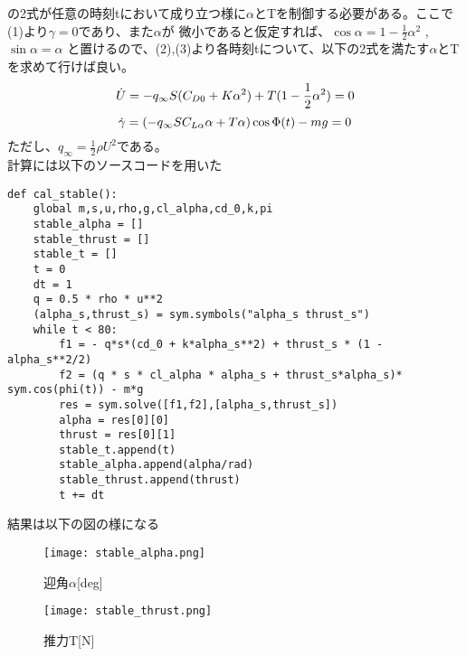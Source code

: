 \documentclass[15pt,uplatex,dvipdfmx]{jsarticle}
\begin{document}
の2式が任意の時刻tにおいて成り立つ様に$\alpha$とTを制御する必要がある。ここで(1)より$\gamma = 0$であり、また$\alpha$が
微小であると仮定すれば、$\cos{\alpha} = 1 - \frac{1}{2} {\alpha}^2$ ,\, $\sin{\alpha} = \alpha$
と置けるので、(2),(3)より各時刻tについて、以下の2式を満たす$\alpha$とTを求めて行けば良い。
\begin{equation}
   \dot{U} = - q_{\infty}S(C_{D0} + K{\alpha}^2) + T(1 - \frac{1}{2} \alpha^2) = 0 \\
\end{equation}
\begin{equation}
  \dot{\gamma} = (- q_{\infty}S C_{L\alpha} \alpha + T\alpha)\cos{\Phi(t)} - mg = 0\\
\end{equation}
ただし、$ q_{\infty}= \frac{1}{2}\rho U^2 $である。 \\
計算には以下のソースコードを用いた \\

\begin{lstlisting}[basicstyle=\ttfamily\footnotesize, frame=single]
def cal_stable():
    global m,s,u,rho,g,cl_alpha,cd_0,k,pi
    stable_alpha = []
    stable_thrust = []
    stable_t = []
    t = 0
    dt = 1
    q = 0.5 * rho * u**2
    (alpha_s,thrust_s) = sym.symbols("alpha_s thrust_s")
    while t < 80:
        f1 = - q*s*(cd_0 + k*alpha_s**2) + thrust_s * (1 - alpha_s**2/2)
        f2 = (q * s * cl_alpha * alpha_s + thrust_s*alpha_s)* sym.cos(phi(t)) - m*g
        res = sym.solve([f1,f2],[alpha_s,thrust_s])
        alpha = res[0][0]
        thrust = res[0][1]
        stable_t.append(t)
        stable_alpha.append(alpha/rad)
        stable_thrust.append(thrust)
        t += dt
\end{lstlisting} \newpage

結果は以下の図の様になる

\begin{figure}[H]
\begin{center}
  \texttt{[image: stable\_alpha.png]}
\end{center}
  \caption{迎角$\alpha$[deg]}
\end{figure}

\begin{figure}[H]
\begin{center}
  \texttt{[image: stable\_thrust.png]}
\end{center}
  \caption{推力T[N]}
\end{figure}
\end{document}
